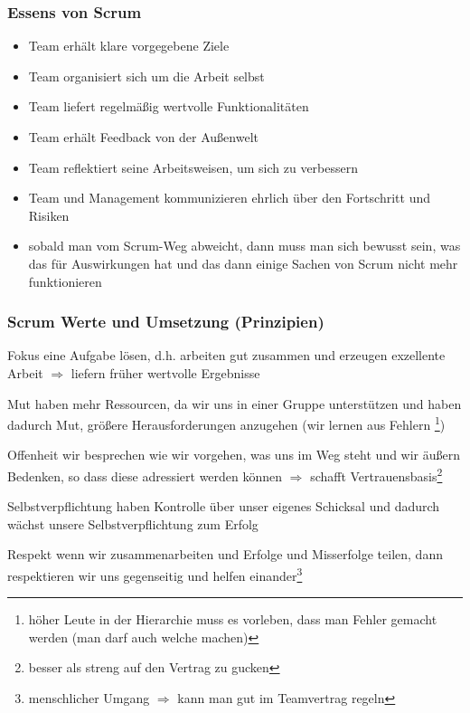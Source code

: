 \subsubsection{Essens von Scrum}
\begin{itemize}
  \item Team erhält klare vorgegebene Ziele
  \item Team organisiert sich um die Arbeit selbst
  \item Team liefert regelmäßig wertvolle Funktionalitäten
  \item Team erhält Feedback von der Außenwelt
  \item Team reflektiert seine Arbeitsweisen, um sich zu verbessern
  \item Team und Management kommunizieren ehrlich über den Fortschritt und Risiken
  \item sobald man vom Scrum-Weg abweicht, dann muss man sich bewusst sein, was das für
    Auswirkungen hat und das dann einige Sachen von Scrum nicht mehr funktionieren
\end{itemize}


\subsubsection{Scrum Werte und Umsetzung (Prinzipien)}

\begin{Beschreibungfett}[Selbstverplfichtung]
  \item [Fokus] eine Aufgabe lösen, d.h. arbeiten gut zusammen und erzeugen exzellente Arbeit
    $\Rightarrow$  liefern früher wertvolle Ergebnisse
  \item [Mut] haben mehr Ressourcen, da wir uns in einer Gruppe unterstützen und haben dadurch Mut,
    größere Herausforderungen anzugehen (wir lernen aus Fehlern \footnote{höher Leute in der Hierarchie muss es vorleben, dass man
      Fehler gemacht werden (man darf auch welche machen)})
  \item [Offenheit] wir besprechen wie wir vorgehen, was uns im Weg steht und wir äußern
    Bedenken, so dass diese adressiert werden können $\Rightarrow$ schafft
  Vertrauensbasis\footnote{besser als streng auf den Vertrag zu gucken}
  \item [Selbstverpflichtung] haben Kontrolle über unser eigenes Schicksal und dadurch wächst
    unsere Selbstverpflichtung zum Erfolg
  \item [Respekt] wenn wir zusammenarbeiten und Erfolge und Misserfolge teilen, dann
    respektieren wir uns gegenseitig und helfen einander\footnote{menschlicher Umgang $\Rightarrow$
    kann man gut im Teamvertrag regeln}
\end{Beschreibungfett}


